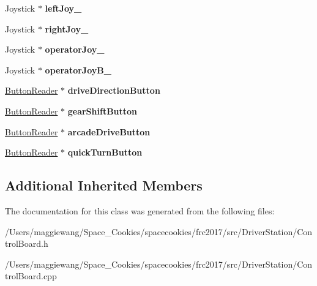 \begin{DoxyCompactItemize}
\item 
\mbox{\label{class_control_board_a3d1d2b17bf6a2290271d6fba94fb20e2}} 
Joystick $\ast$ {\bfseries left\+Joy\+\_\+}
\item 
\mbox{\label{class_control_board_a9f99e67fc5be70b7a242b489d106e6e4}} 
Joystick $\ast$ {\bfseries right\+Joy\+\_\+}
\item 
\mbox{\label{class_control_board_a32d6c4eeaf66d97bd1c407bbaccebb0b}} 
Joystick $\ast$ {\bfseries operator\+Joy\+\_\+}
\item 
\mbox{\label{class_control_board_a862917fc3f42591da7f743cb5a474f69}} 
Joystick $\ast$ {\bfseries operator\+Joy\+B\+\_\+}
\item 
\mbox{\label{class_control_board_a2bc303faf6f560ee5bc50740d531087f}} 
\hyperlink{class_button_reader}{Button\+Reader} $\ast$ {\bfseries drive\+Direction\+Button}
\item 
\mbox{\label{class_control_board_a169abc98da7af2228d32e6af40b59618}} 
\hyperlink{class_button_reader}{Button\+Reader} $\ast$ {\bfseries gear\+Shift\+Button}
\item 
\mbox{\label{class_control_board_a85921de97d4183cfb321f6dfb3aa09a6}} 
\hyperlink{class_button_reader}{Button\+Reader} $\ast$ {\bfseries arcade\+Drive\+Button}
\item 
\mbox{\label{class_control_board_a7f00556cbd9514ab50e79fd202187b27}} 
\hyperlink{class_button_reader}{Button\+Reader} $\ast$ {\bfseries quick\+Turn\+Button}
\end{DoxyCompactItemize}
\subsection*{Additional Inherited Members}


The documentation for this class was generated from the following files\+:\begin{DoxyCompactItemize}
\item 
/\+Users/maggiewang/\+Space\+\_\+\+Cookies/spacecookies/frc2017/src/\+Driver\+Station/Control\+Board.\+h\item 
/\+Users/maggiewang/\+Space\+\_\+\+Cookies/spacecookies/frc2017/src/\+Driver\+Station/Control\+Board.\+cpp\end{DoxyCompactItemize}
